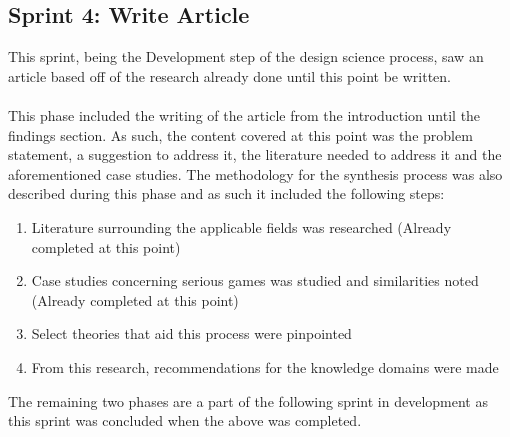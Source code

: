 \subsection{Sprint 4: Write Article}
This sprint, being the Development step of the design science process, saw an article based off of the research already done until this point be written. 
\\\\
This phase included the writing of the article from the introduction until the findings section. As such, the content covered at this point was the problem statement, a suggestion to address it, the literature needed to address it and the aforementioned case studies. The methodology for the synthesis process was also described during this phase and as such it included the following steps:
\begin{enumerate}
\item Literature surrounding the applicable fields was researched (Already completed at this point)
\item Case studies concerning serious games was studied and similarities noted (Already completed at this point)
\item Select theories that aid this process were pinpointed 
\item From this research, recommendations for the knowledge domains were made
\end{enumerate}

\noindent The remaining two phases are a part of the following sprint in development as this sprint was concluded when the above was completed.

